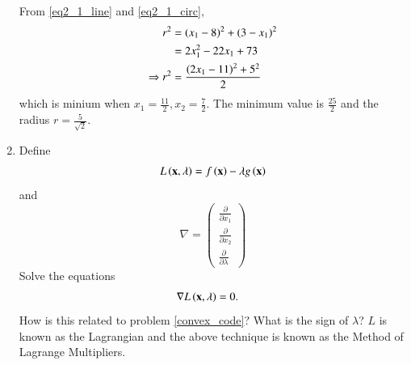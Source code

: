 \documentclass[journal,12pt,twocolumn]{IEEEtran}
\renewcommand\thesection{\arabic{section}}
\begin{document}
\begin{enumerate}[label=\thesection.\arabic*,ref=\thesection.\theenumi]
\solution 
From \eqref{eq2_1_line} and \eqref{eq2_1_circ}, 
%
\begin{align}
r^2 & = (x_1-8)^2 + (3- x_1)^2 \\
&= 2 x_1^2 - 22 x_1 + 73 \\
\Rightarrow r^2 &= \frac{\left(2x_1-11\right)^2 + 5^2}{2}
\end{align}
%
which is minium when $x_1 = \frac{11}{2}, x_2 = \frac{7}{2}$.  The minimum value is $\frac{25}{2}$ and 
the radius $r = \frac{5}{\sqrt{2}}$.
\item
\label{lagrange}
	Define 
	\begin{equation}
	\label{lagrangian}
	L\brak{\mbf{x},\lambda} = f\brak{\mbf{x}} - \lambda g\brak{\mbf{x}}%
	\end{equation}
and
\begin{equation}
\nabla =  
\begin{pmatrix}
\frac{\partial}{\partial x_1} \\
\frac{\partial}{\partial x_2} \\
\frac{\partial}{\partial \lambda} 
\end{pmatrix}
\end{equation}
Solve the equations
%
\begin{align}
\nabla L\left(\mathbf{x},\lambda\right) &= 0.
\label{tangent}
\end{align}
%
How is this related to problem \ref{convex_code}? What is the sign of $\lambda$?  $L$ is known as the Lagrangian and the above technique is known as the Method of Lagrange Multipliers.


\end{enumerate}
\end{document}
